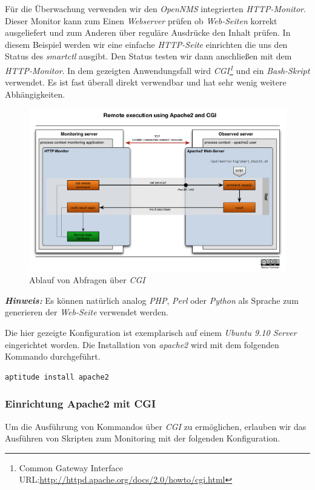 Für die Überwachung verwenden wir den \emph{OpenNMS} integrierten \emph{HTTP-Monitor}. Dieser Monitor kann zum Einen \emph{Webserver} prüfen ob \emph{Web-Seiten} korrekt ausgeliefert und zum Anderen über reguläre Ausdrücke den Inhalt prüfen. In diesem Beispiel werden wir eine einfache \emph{HTTP-Seite} einrichten die uns den Status des \emph{smartctl} ausgibt. Den Status  testen wir dann anschließen mit dem \emph{HTTP-Monitor}. In dem gezeigten Anwendungsfall wird \emph{CGI\footnote{Common Gateway Interface URL:\url{http://httpd.apache.org/docs/2.0/howto/cgi.html}}} und ein \emph{Bash-Skript} verwendet. Es ist fast überall direkt verwendbar und hat sehr wenig weitere Abhängigkeiten.

\begin{figure}[H]
	\centering
	\includegraphics[width=1.0\textwidth]{images/use-cases/script-extending-linux/flow-cgi}
	\caption{Ablauf von Abfragen über \emph{CGI}}
	\label{pic:flow-cgi}
\end{figure}

\textbf{\textit{Hinweis:}} Es können natürlich analog \emph{PHP}, \emph{Perl} oder \emph{Python} als Sprache zum generieren der \emph{Web-Seite} verwendet werden.

Die hier gezeigte Konfiguration ist exemplarisch auf einem \emph{Ubuntu 9.10 Server} eingerichtet worden. Die Installation von \emph{apache2} wird mit dem folgenden Kommando durchgeführt.

\begin{lstlisting}[numbers=none]
aptitude install apache2
\end{lstlisting}

\subsubsection{Einrichtung Apache2 mit CGI}
Um die Ausführung von Kommandos über \emph{CGI} zu ermöglichen, erlauben wir das Ausführen von Skripten zum Monitoring mit der folgenden Konfiguration.

